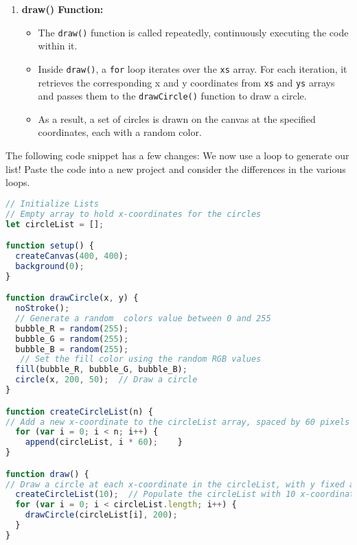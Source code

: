 \begin{exercisebox}[adjusted title= Explanation Loops I ]
\begin{enumerate}
    \item \textbf{draw() Function:}
    \begin{itemize}
        \item The \texttt{draw()} function is called repeatedly, continuously executing the code within it.
        \item Inside \texttt{draw()}, a \texttt{for} loop iterates over the \texttt{xs} array. For each iteration, it retrieves the corresponding x and y coordinates from \texttt{xs} and \texttt{ys} arrays and passes them to the \texttt{drawCircle()} function to draw a circle.
        \item As a result, a set of circles is drawn on the canvas at the specified coordinates, each with a random color.
    \end{itemize}
\end{enumerate}
\end{exercisebox}






\begin{exercisebox}[adjusted title= More with Lists and For Loops II]
The following code snippet has a few changes: We now use a loop to generate our list! Paste the code into a new project and consider the differences in the various loops.

\begin{lstlisting}[language=JavaScript]
// Initialize Lists
// Empty array to hold x-coordinates for the circles
let circleList = []; 

function setup() {
  createCanvas(400, 400);  
  background(0); 
}

function drawCircle(x, y) {
  noStroke(); 
  // Generate a random  colors value between 0 and 255
  bubble_R = random(255);  
  bubble_G = random(255); 
  bubble_B = random(255);
   // Set the fill color using the random RGB values
  fill(bubble_R, bubble_G, bubble_B); 
  circle(x, 200, 50);  // Draw a circle
}

function createCircleList(n) {
// Add a new x-coordinate to the circleList array, spaced by 60 pixels
  for (var i = 0; i < n; i++) {
    append(circleList, i * 60);    }
}

function draw() {
// Draw a circle at each x-coordinate in the circleList, with y fixed at 200
  createCircleList(10);  // Populate the circleList with 10 x-coordinates
  for (var i = 0; i < circleList.length; i++) {
    drawCircle(circleList[i], 200);  
  }
}
\end{lstlisting}

\noindent


\noindent
\end{exercisebox}


